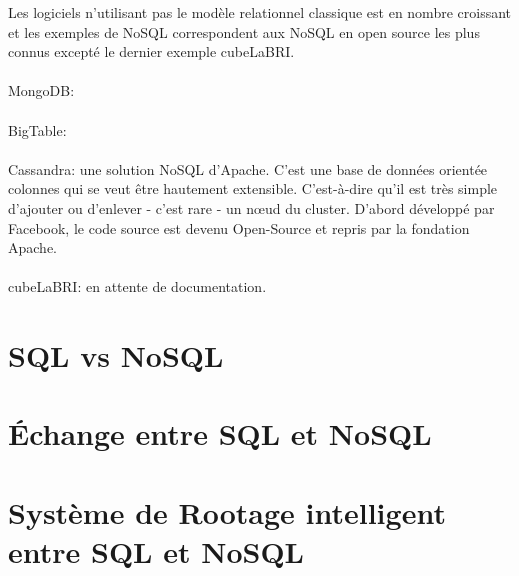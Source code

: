 Les logiciels n'utilisant pas le modèle relationnel classique est en
nombre croissant et les exemples de \textsf{NoSQL} correspondent aux
\textsf{NoSQL} en open source les plus connus excepté le dernier
exemple \textsf{cubeLaBRI}.  
\\\\ 
{\sf MongoDB}:
\\\\ 
\textsf{BigTable}: 
\\\\ 
\textsf{Cassandra}: une solution NoSQL d’Apache. 
C’est une base de données orientée colonnes
qui se veut être hautement extensible. C’est-à-dire qu’il est très
simple d’ajouter ou d’enlever - c’est rare - un nœud du
cluster. D’abord développé par Facebook, le code source est devenu
Open-Source et repris par la fondation Apache\cite{cassandra}.
\\\\ 
\textsf{cubeLaBRI}: en attente de documentation.

\section{\textsf{SQL} vs \textsf{NoSQL}}

\section{Échange entre \textsf{SQL} et \textsf{NoSQL}}

\section{Système de Rootage intelligent entre {\sf SQL} et {\sf NoSQL}}
